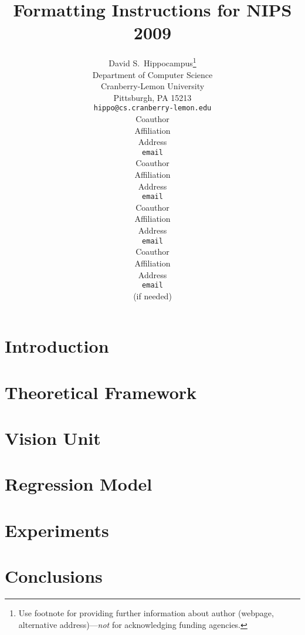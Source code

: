 \documentclass{article}
\title{Formatting Instructions for NIPS 2009}
\author{
David S.~Hippocampus\thanks{ Use footnote for providing further information
about author (webpage, alternative address)---\emph{not} for acknowledging
funding agencies.} \\
Department of Computer Science\\
Cranberry-Lemon University\\
Pittsburgh, PA 15213 \\
\texttt{hippo@cs.cranberry-lemon.edu} \\
\And
Coauthor \\
Affiliation \\
Address \\
\texttt{email} \\
\AND
Coauthor \\
Affiliation \\
Address \\
\texttt{email} \\
\And
Coauthor \\
Affiliation \\
Address \\
\texttt{email} \\
\And
Coauthor \\
Affiliation \\
Address \\
\texttt{email} \\
(if needed)\\
}
\begin{document}
\makeanontitle

\begin{abstract}

\end{abstract}

\section{Introduction}

\label{sec:intro}

\section{Theoretical Framework}
\label{sec::framework}


\section{Vision Unit}
\label{sec::vision}


\section{Regression Model}
\label{sec::regression}


\section{Experiments}


\section{Conclusions}



\end{document}

